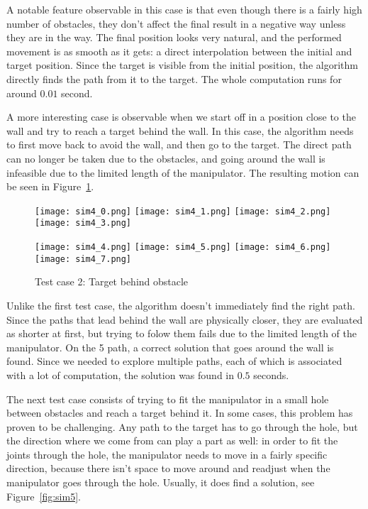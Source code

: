 A notable feature observable in this case is that even though there is a fairly high number of obstacles, they don't affect the final result in a negative way unless they are in the way. The final position looks very natural, and the performed movement is as smooth as it gets: a direct interpolation between the initial and target position. Since the target is visible from the initial position, the algorithm directly finds the path from it to the target. The whole computation runs for around $0.01$ second.

A more interesting case is observable when we start off in a position close to the wall and try to reach a target behind the wall. In this case, the algorithm needs to first move back to avoid the wall, and then go to the target. The direct path can no longer be taken due to the obstacles, and going around the wall is infeasible due to the limited length of the manipulator. The resulting motion can be seen in Figure~\ref{fig:sim4}.

\begin{figure}[h]
  \centering
  \begin{minipage}{\textwidth}
    \texttt{[image: sim4\_0.png]}
    \texttt{[image: sim4\_1.png]}
    \texttt{[image: sim4\_2.png]}
    \texttt{[image: sim4\_3.png]}

    \texttt{[image: sim4\_4.png]}
    \texttt{[image: sim4\_5.png]}
    \texttt{[image: sim4\_6.png]}
    \texttt{[image: sim4\_7.png]}
  \end{minipage}
  \caption{Test case 2: Target behind obstacle}\label{fig:sim4}
\end{figure}

Unlike the first test case, the algorithm doesn't immediately find the right path. Since the paths that lead behind the wall are physically closer, they are evaluated as shorter at first, but trying to folow them fails due to the limited length of the manipulator. On the 5\th{} path, a correct solution that goes around the wall is found. Since we needed to explore multiple paths, each of which is associated with a lot of computation, the solution was found in $0.5$ seconds.

The next test case consists of trying to fit the manipulator in a small hole between obstacles and reach a target behind it. In some cases, this problem has proven to be challenging.
Any path to the target has to go through the hole, but the direction where we come from can play a part as well: in order to fit the joints through the hole, the manipulator needs to move in a fairly specific direction, because there isn't space to move around and readjust when the manipulator goes through the hole. Usually, it does find a solution, see Figure~\ref{fig:sim5}.


